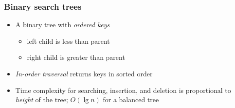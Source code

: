 \documentclass{beamer}
\begin{document}
\begin{frame}
 \frametitle{Binary search trees}
 \begin{itemize}
  \item A binary tree with \emph{ordered keys}
   \begin{itemize}
    \item left child is less than parent
    \item right child is greater than parent
   \end{itemize}
  \item \emph{In-order traversal} returns keys in sorted order
  \item Time complexity for searching, insertion, and deletion is
        proportional to \emph{height} of the tree; $O(\lg n)$ for a
        balanced tree
 \end{itemize}
 \begin{center}
  \scalebox{1.0} {
  }
 \end{center}
\end{frame}
\end{document}
